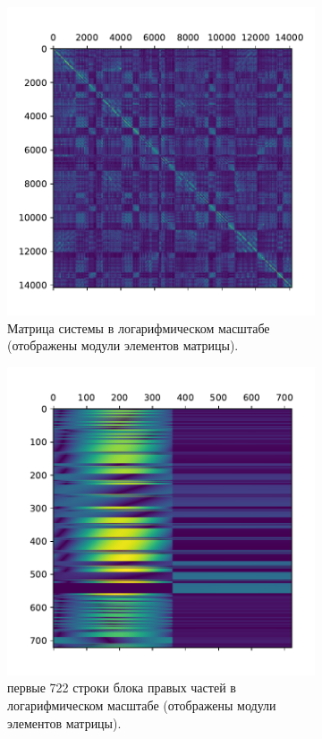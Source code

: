 \begin{figure}[H] 
    \begin{subfigure}{.5\textwidth}
        \centering
        \includegraphics[width=0.7\linewidth]{images/mat.pdf}
        \caption{Матрица системы в логарифмическом масштабе (отображены модули элементов матрицы).}
        \label{fig:matrix}
    \end{subfigure}
    \begin{subfigure}{.5\textwidth}
        \centering
        \includegraphics[width=0.7\linewidth]{images/rhs.pdf}
        \caption{первые 722 строки блока правых частей в логарифмическом масштабе (отображены модули элементов матрицы).}
        \label{fig:rhs}
    \end{subfigure}
    \caption{}
    \label{fig:matrixnrhs}
\end{figure} 

